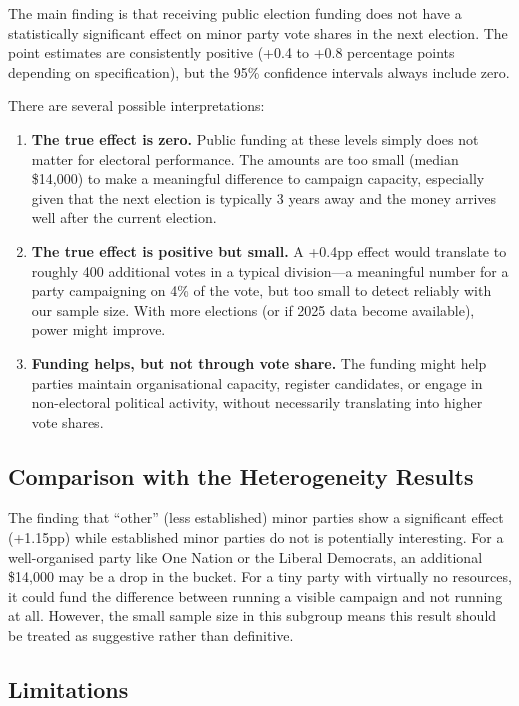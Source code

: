 \documentclass[12pt, a4paper]{article}
\begin{document}
The main finding is that receiving public election funding does not have a statistically significant effect on minor party vote shares in the next election. The point estimates are consistently positive (+0.4 to +0.8 percentage points depending on specification), but the 95\% confidence intervals always include zero.

There are several possible interpretations:

\begin{enumerate}
    \item \textbf{The true effect is zero.} Public funding at these levels simply does not matter for electoral performance. The amounts are too small (median \$14,000) to make a meaningful difference to campaign capacity, especially given that the next election is typically 3 years away and the money arrives well after the current election.

    \item \textbf{The true effect is positive but small.} A +0.4pp effect would translate to roughly 400 additional votes in a typical division---a meaningful number for a party campaigning on 4\% of the vote, but too small to detect reliably with our sample size. With more elections (or if 2025 data become available), power might improve.

    \item \textbf{Funding helps, but not through vote share.} The funding might help parties maintain organisational capacity, register candidates, or engage in non-electoral political activity, without necessarily translating into higher vote shares.
\end{enumerate}

\subsection{Comparison with the Heterogeneity Results}

The finding that ``other'' (less established) minor parties show a significant effect (+1.15pp) while established minor parties do not is potentially interesting. For a well-organised party like One Nation or the Liberal Democrats, an additional \$14,000 may be a drop in the bucket. For a tiny party with virtually no resources, it could fund the difference between running a visible campaign and not running at all. However, the small sample size in this subgroup means this result should be treated as suggestive rather than definitive.

\subsection{Limitations}
\end{document}
